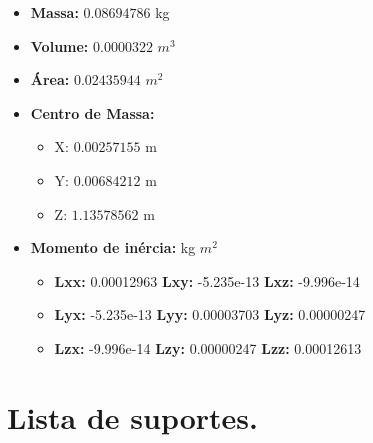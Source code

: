 \documentclass[
12pt,					%
openright,				%
twoside,				%
a4paper,				%
english,
brazil
]{ABNT/abntex2_report}
\begin{document}
	\begin{itemize}
		\item \textbf{Massa:} $0.08694786$ kg
		\item \textbf{Volume:} $0.0000322$ $m^{3}$
		\item \textbf{Área:} $0.02435944$ $m^{2}$
		\item \textbf{Centro de  Massa:}
		\begin{itemize}
			\item X: $0.00257155$ m			
			\item Y: $0.00684212$ m			
			\item Z: $1.13578562$ m
			
		\end{itemize}
		
		\item \textbf{Momento de inércia:} kg $m^{2}$
		\begin{itemize}
			\item \textbf{Lxx:}	0.00012963 \textbf{Lxy:} -5.235e-13  \textbf{Lxz:} -9.996e-14			   
			\item \textbf{Lyx:} -5.235e-13 \textbf{Lyy:} 0.00003703 \textbf{Lyz:} 0.00000247			   
			\item \textbf{Lzx:} -9.996e-14 \textbf{Lzy:} 0.00000247	 \textbf{Lzz:} 0.00012613			 
		\end{itemize}
	\end{itemize}

	\chapter{Lista de suportes.}
	\label{apend:frames}
\end{document}
